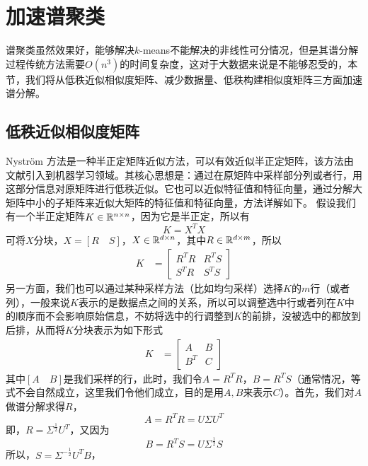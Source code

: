 \section{加速谱聚类}
谱聚类虽然效果好，能够解决$k$-means不能解决的非线性可分情况，但是其谱分解过程传统方法需要$O(n^3)$的时间复杂度，这对于大数据来说是不能够忍受的，本节，我们将从低秩近似相似度矩阵、减少数据量、低秩构建相似度矩阵三方面加速谱分解。
\subsection{低秩近似相似度矩阵}
Nyström 方法是一种半正定矩阵近似方法，可以有效近似半正定矩阵，该方法由文献\cite{williams2001using}引入到机器学习领域。其核心思想是：通过在原矩阵中采样部分列或者行，用这部分信息对原矩阵进行低秩近似。它也可以近似特征值和特征向量，通过分解大矩阵中小的子矩阵来近似大矩阵的特征值和特征向量，方法详解如下。
假设我们有一个半正定矩阵$K \in \mathbb{R}^{n \times n}$，因为它是半正定，所以有
\begin{equation}
    K = X^T X
\end{equation}
可将$X$分块，$X=[R\quad S]$，$X \in \mathbb{R}^{d\times n}$，其中$R \in \mathbb{R}^{d\times m}$，所以
\begin{align}
    K & = \begin{bmatrix}
            R^T R & R^T S \\
            S^T R & S^T S 
          \end{bmatrix} 
\end{align}
另一方面，我们也可以通过某种采样方法（比如均匀采样）选择$K$的$m$行（或者列），一般来说$K$表示的是数据点之间的关系，所以可以调整选中行或者列在$K$中的顺序而不会影响原始信息，不妨将选中的行调整到$K$的前排，没被选中的都放到后排，从而将$K$分块表示为如下形式
\begin{align}
    K & = \begin{bmatrix}
            A & B \\
            B^T & C
          \end{bmatrix} 
\end{align}
其中$[A \quad B]$是我们采样的行，此时，我们令$A = R^T R$，$B = R^T S$（通常情况，等式不会自然成立，这里我们令他们成立，目的是用$A,B$来表示$C$）。首先，我们对$A$做谱分解求得$R$，
\begin{equation}
    A = R^T R = U\Sigma U^T
\end{equation}
即，$R = \Sigma^{\frac{1}{2}}U^T$，又因为
\begin{equation}
    B = R^T S = U\Sigma^{\frac{1}{2}}S
\end{equation}
所以，$S = \Sigma^{-\frac{1}{2}}U^T B$，
